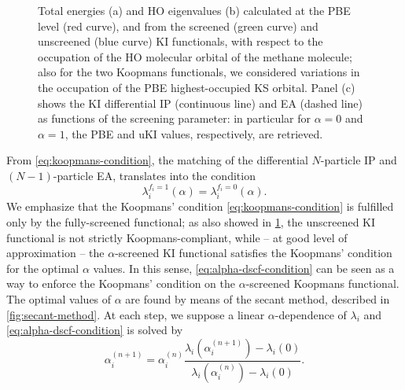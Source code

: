 \begin{figure}
    \centering
    \usebox{\measurebox}
    \begin{minipage}{.48\linewidth}
        \vfill
    \end{minipage}
    \caption[Total energy and $\varepsilon_{\rm HO}$ vs. $f_{\rm HO}$ for $CH_4$ molecule]{Total energies (a) and HO eigenvalues (b) calculated at the PBE level (red curve), and from the screened (green curve) and unscreened (blue curve) KI functionals, with respect to the occupation of the HO molecular orbital of the methane molecule; also for the two Koopmans functionals, we considered variations in the occupation of the PBE highest-occupied KS orbital. Panel (c) shows the KI differential IP (continuous line) and EA (dashed line) as functions of the screening parameter: in particular for $\alpha=0$ and $\alpha=1$, the PBE and uKI values, respectively, are retrieved.}
    \label{fig:pwl-ki-dft}
\end{figure}

From \cref{eq:koopmans-condition}, the matching of the differential $N$-particle IP and $(N-1)$-particle EA, translates into the condition
%
\begin{equation}
    \lambda_i^{f_i=1}(\alpha) = \lambda_i^{f_i=0}(\alpha) .
    \label{eq:alpha-dscf-condition}
\end{equation}
%
We emphasize that the Koopmans' condition \eqref{eq:koopmans-condition} is fulfilled only by the fully-screened functional; as also showed in \cref{fig:pwl-ki-dft}, the unscreened KI functional is not strictly Koopmans-compliant, while -- at good level of approximation -- the $\alpha$-screened KI functional satisfies the Koopmans' condition for the optimal $\alpha$ values. In this sense, \cref{eq:alpha-dscf-condition} can be seen as a way to enforce the Koopmans' condition on the $\alpha$-screened Koopmans functional. The optimal values of $\alpha$ are found by means of the secant method, described in \cref{fig:secant-method}. At each step, we suppose a linear $\alpha$-dependence of $\lambda_i$ and \cref{eq:alpha-dscf-condition} is solved by
%
\begin{equation}
    \alpha_i^{(n+1)} = \alpha_i^{(n)} \frac{\lambda_i(\alpha_i^{(n+1)}) - \lambda_i(0)}{\lambda_i(\alpha_i^{(n)}) - \lambda_i(0)} .
    \label{eq:alpha-intermediate-expression}
\end{equation}

